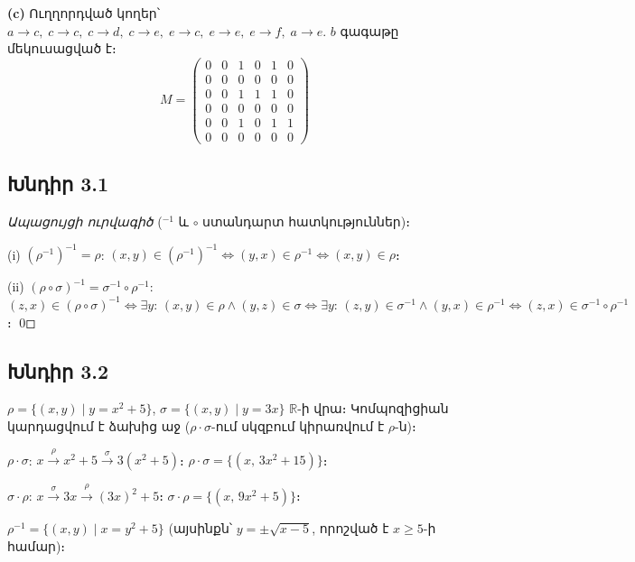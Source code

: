 \textbf{(c)} Ուղղորդված կողեր՝ $a\!\to\!c,\; c\!\to\!c,\; c\!\to\!d,\; c\!\to\!e,\; e\!\to\!c,\; e\!\to\!e,\; e\!\to\!f,\; a\!\to\!e$. $b$ գագաթը մեկուսացված է։
\[
  M = \begin{pmatrix}
  0&0&1&0&1&0\\0&0&0&0&0&0\\0&0&1&1&1&0\\0&0&0&0&0&0\\0&0&1&0&1&1\\0&0&0&0&0&0
  \end{pmatrix}
\]


\subsection*{Խնդիր 3.1}

\emph{Ապացույցի ուրվագիծ} (${}^{-1}$ և $\circ$ ստանդարտ հատկություններ)։

(i) $(\rho^{-1})^{-1}=\rho$: $(x,y)\in(\rho^{-1})^{-1}\Leftrightarrow (y,x)\in\rho^{-1}\Leftrightarrow (x,y)\in\rho$։

(ii) $(\rho\circ\sigma)^{-1}=\sigma^{-1}\circ\rho^{-1}$: $(z,x)\in(\rho\circ\sigma)^{-1} \Leftrightarrow \exists y\!:\,(x,y)\in\rho\land(y,z)\in\sigma \Leftrightarrow \exists y\!:\,(z,y)\in\sigma^{-1}\land(y,x)\in\rho^{-1} \Leftrightarrow (z,x)\in\sigma^{-1}\circ\rho^{-1}$։ \qed


\subsection*{Խնդիր 3.2}

$\rho=\{(x,y)\mid y=x^2+5\}$, $\sigma=\{(x,y)\mid y=3x\}$ $\mathbb{R}$-ի վրա։
Կոմպոզիցիան կարդացվում է ձախից աջ ($\rho\cdot\sigma$-ում սկզբում կիրառվում է $\rho$-ն)։

$\rho\cdot\sigma$: $x\xrightarrow{\rho}x^2+5\xrightarrow{\sigma}3(x^2+5)$։ \;$\boxed{\rho\cdot\sigma=\{(x,\,3x^2+15)\}}$։

$\sigma\cdot\rho$: $x\xrightarrow{\sigma}3x\xrightarrow{\rho}(3x)^2+5$։ \;$\boxed{\sigma\cdot\rho=\{(x,\,9x^2+5)\}}$։

$\boxed{\rho^{-1}=\{(x,y)\mid x=y^2+5\}}$ (այսինքն՝ $y=\pm\sqrt{x-5}$, որոշված է $x\ge 5$-ի համար)։

